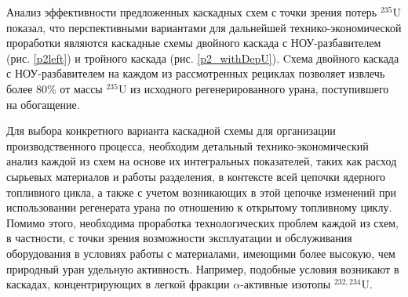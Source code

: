 Анализ эффективности предложенных каскадных схем с точки зрения потерь $^{235}$U показал, что перспективными вариантами для дальнейшей технико-экономической проработки являются каскадные схемы двойного каскада с НОУ-разбавителем (рис. \ref{p2left}) и тройного каскада (рис. \ref{p2_withDepU}). Cхема двойного каскада с НОУ-разбавителем на каждом из рассмотренных рециклах позволяет извлечь более 80\% от массы $^{235}$U из исходного регенерированного урана, поступившего на обогащение.

Для выбора конкретного варианта каскадной схемы для организации производственного процесса, необходим детальный технико-экономический анализ каждой из схем на основе их интегральных показателей, таких как расход сырьевых материалов и работы разделения, в контексте всей цепочки ядерного топливного цикла, а также с учетом возникающих в этой цепочке изменений при использовании регенерата урана по отношению к открытому топливному циклу. Помимо этого, необходима проработка технологических проблем каждой из схем, в частности, с точки зрения возможности эксплуатации и обслуживания оборудования в условиях работы с материалами, имеющими более высокую, чем природный уран удельную активность. Например, подобные условия возникают в каскадах, концентрирующих в легкой фракции $\alpha$-активные изотопы $^{232,234}$U.

\clearpage

